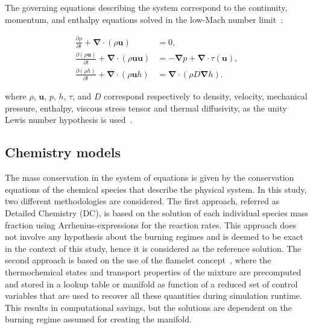 \documentclass[preprint,12pt,authoryear]{elsarticle}
\begin{document}
The governing equations describing the system correspond to the continuity, momentum, and enthalpy equations solved in the low-Mach number limit~\citep{both_low-dissipation_2020}: 

\vspace{-15pt}

\begin{align}
\frac{\partial \rho}{\partial t} + \bm{\nabla} \cdot \left( \rho \textbf{u} \right) &= 0, \label{eqn:continuity}\\
\frac{\partial \left( \rho \textbf{u} \right)}{\partial t} + \bm{\nabla} \cdot \left( \rho \textbf{u} \textbf{u} \right) &= -  \bm{\nabla} p + \bm{\nabla} \cdot  \tau \left( \textbf{u} \right), \label{eqn:momentum} \\
\frac{\partial \left( \rho h \right)}{\partial t} + \bm{\nabla} \cdot \left( \rho \textbf{u} h \right) &= \bm{\nabla} \cdot \left( \rho D \bm{\nabla} h \right). \label{eqn:energy_enthalpy} 
\end{align}

\noindent where $\rho$, $\textbf{u}$, $p$, $h$, $\tau$, and $D$ correspond respectively to density, velocity, mechanical pressure, enthalpy, viscous stress tensor and thermal diffusivity, as the unity Lewis number hypothesis is used~\citep{surapaneni_assessment_2023}. 


\subsection{Chemistry models}
\label{sec:chemistry_models}

The mass conservation in the system of equations is given by the conservation equations of the chemical species that describe the physical system. In this study, two different methodologies are considered. The first approach, referred as Detailed Chemistry (DC), is based on the solution of each individual species mass fraction using Arrhenius-expressions for the reaction rates. This approach does not involve any hypothesis about the burning regimes and is deemed to be exact in the context of this study, hence it is considered as the reference solution. The second approach is based on the use of the flamelet concept~\citep{van_oijen_modelling_2000,illana_extended_2021}, where the thermochemical states and transport properties of the mixture are precomputed and stored in a lookup table or manifold as function of a reduced set of control variables that are used to recover all these quantities during simulation runtime. This results in computational savings, but the solutions are dependent on the burning regime assumed for creating the manifold.
\end{document}
